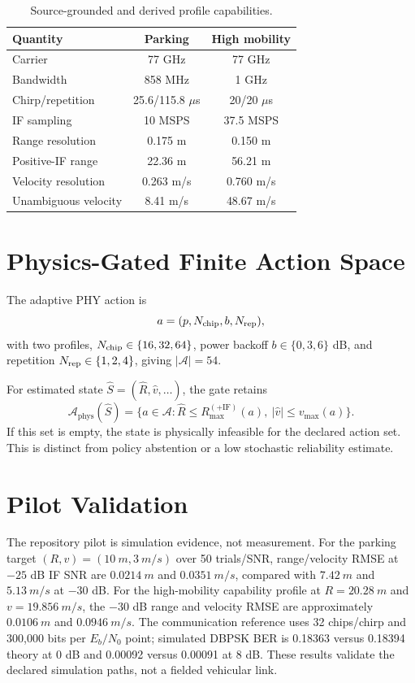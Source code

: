 \documentclass[journal]{IEEEtran}
\begin{document}
\begin{table}[t]
\centering
\caption{Source-grounded and derived profile capabilities.}
\label{tab:profiles}
\begin{tabular}{lcc}\toprule
Quantity & Parking & High mobility\\\midrule
Carrier & 77 GHz & 77 GHz\\
Bandwidth & 858 MHz & 1 GHz\\
Chirp/repetition & 25.6/115.8 $\mu$s & 20/20 $\mu$s\\
IF sampling & 10 MSPS & 37.5 MSPS\\
Range resolution & 0.175 m & 0.150 m\\
Positive-IF range & 22.36 m & 56.21 m\\
Velocity resolution & 0.263 m/s & 0.760 m/s\\
Unambiguous velocity & 8.41 m/s & 48.67 m/s\\\bottomrule
\end{tabular}
\end{table}

\section{Physics-Gated Finite Action Space}
The adaptive PHY action is
\begin{equation}
a=(p,N_{\rm chip},b,N_{\rm rep}),
\end{equation}
with two profiles, $N_{\rm chip}\in\{16,32,64\}$, power backoff $b\in\{0,3,6\}$ dB, and repetition $N_{\rm rep}\in\{1,2,4\}$, giving $|\mathcal A|=54$.

For estimated state $\hat S=(\hat R,\hat v,\ldots)$, the gate retains
\begin{equation}
\mathcal{A}_{\mathrm{phys}}(\hat S)=\{a\in\mathcal{A}:\hat R\le R_{\max}^{(+\mathrm{IF})}(a),\ |\hat v|\le v_{\max}(a)\}.
\end{equation}
If this set is empty, the state is physically infeasible for the declared action set. This is distinct from policy abstention or a low stochastic reliability estimate.

\section{Pilot Validation}
The repository pilot is simulation evidence, not measurement. For the parking target $(R,v)=(\SI{10}{m},\SI{3}{m/s})$ over 50 trials/SNR, range/velocity RMSE at $-25$ dB IF SNR are $\SI{0.0214}{m}$ and $\SI{0.0351}{m/s}$, compared with $\SI{7.42}{m}$ and $\SI{5.13}{m/s}$ at $-30$ dB. For the high-mobility capability profile at $R=\SI{20.28}{m}$ and $v=\SI{19.856}{m/s}$, the $-30$ dB range and velocity RMSE are approximately $\SI{0.0106}{m}$ and $\SI{0.0946}{m/s}$. The communication reference uses 32 chips/chirp and 300,000 bits per $E_b/N_0$ point; simulated DBPSK BER is 0.18363 versus 0.18394 theory at 0 dB and 0.00092 versus 0.00091 at 8 dB. These results validate the declared simulation paths, not a fielded vehicular link.
\end{document}
